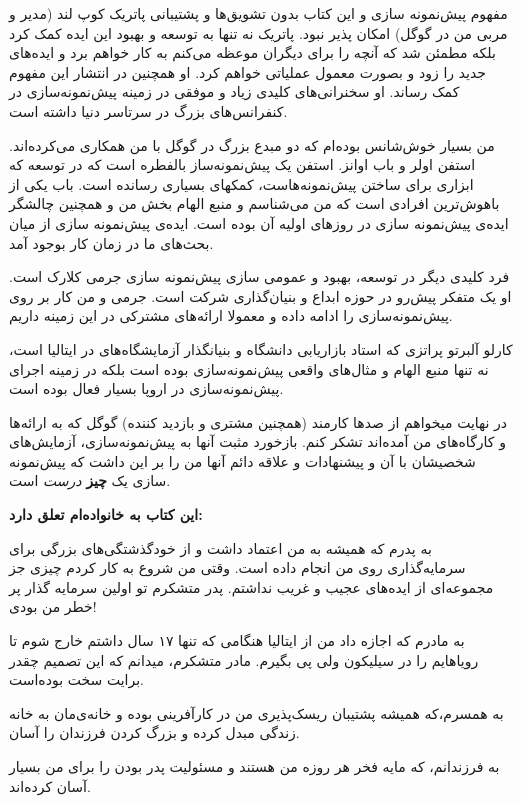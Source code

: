 مفهوم پیش‌نمونه سازی و این کتاب بدون تشویق‌ها و پشتیبانی پاتریک کوپ لند
(مدیر و مربی من در گوگل) امکان پذیر نبود. پاتریک نه تنها به توسعه و
بهبود این ایده کمک کرد بلکه مطمئن شد که آنچه را برای دیگران موعظه می‌کنم
به کار خواهم برد و ایده‌های جدید را زود و بصورت معمول عملیاتی خواهم کرد.
او همچنین در انتشار این مفهوم کمک رساند. او سخنرانی‌‌های کلیدی زیاد و
موفقی در زمینه پیش‌نمونه‌سازی در کنفرانس‌های بزرگ در سرتاسر دنیا داشته
است.

من بسیار خوش‌شانس بوده‌ام که دو مبدع بزرگ در گوگل با من همکاری
می‌کرده‌اند. استفن اولر و باب اوانز. استفن یک پیش‌نمونه‌ساز بالفطره است
که در توسعه  که ابزاری برای ساختن پیش‌نمونه‌هاست، کمکهای
بسیاری رسانده است. باب یکی از باهوش‌ترین افرادی است که من می‌شناسم و
منبع الهام بخش من و همچنین چالشگر ایده‌ی پیش‌نمونه سازی در روزهای اولیه
آن بوده است. ایده‌ی پیش‌نمونه سازی از میان بحث‌های ما در زمان کار بوجود
آمد.

فرد کلیدی دیگر در توسعه، بهبود و عمومی سازی پیش‌نمونه سازی جرمی کلارک
است. او یک متفکر پیش‌رو در حوزه ابداع و بنیان‌گذاری شرکت  است.
جرمی و من کار بر روی پیش‌نمونه‌سازی را ادامه داده و معمولا ارائه‌های
مشترکی در این زمینه داریم.

کارلو آلبرتو پراتزی که استاد بازاریابی دانشگاه   و
بنیانگذار آزمایشگاه‌های  در ایتالیا است، نه تنها منبع
الهام و مثال‌های واقعی پیش‌نمونه‌سازی بوده است بلکه در زمینه اجرای
پیش‌نمونه‌سازی در اروپا بسیار فعال بوده است.

در نهایت میخواهم از صدها کارمند (همچنین مشتری و بازدید کننده) گوگل که به
ارائه‌ها و کارگاه‌های من آمده‌اند تشکر کنم. بازخورد مثبت آنها به
پیش‌نمونه‌سازی، آزمایش‌های شخصیشان با آن و پیشنهادات و علاقه دائم آنها
من را بر این داشت که پیش‌نمونه سازی یک \textbf{چیز} \emph{درست} است.

\textbf{این کتاب به خانواده‌ام تعلق دارد:}

به پدرم که همیشه به من اعتماد داشت و از خودگذشتگی‌های بزرگی برای
سرمایه‌گذاری روی من انجام داده است. وقتی من شروع به کار کردم چیزی جز
مجموعه‌ای از ایده‌های عجیب و غریب نداشتم. پدر متشکرم تو اولین سرمایه
گذار پر خطر من بودی!

به مادرم که اجازه داد من از ایتالیا هنگامی که تنها ۱۷ سال داشتم خارج شوم
تا رویاهایم را در سیلیکون ولی پی بگیرم. مادر متشکرم، میدانم که این تصمیم
چقدر برایت سخت بوده‌است.

به همسرم،که همیشه پشتیبان ریسک‌پذیری من در کارآفرینی بوده و خانه‌ی‌مان
به خانه زندگی مبدل کرده و بزرگ کردن فرزندان را آسان.

به فرزندانم، که مایه فخر هر روزه من هستند و مسئولیت پدر بودن را برای من
بسیار آسان کرده‌اند.
